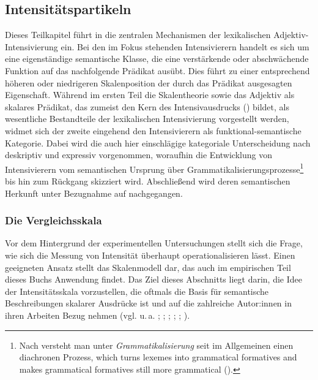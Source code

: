 \subsection{Intensitätspartikeln} \label{Intensivierer}
Dieses Teilkapitel führt in die zentralen Mechanismen der lexikalischen Adjektiv-Intensivierung ein. Bei den im Fokus stehenden Intensivierern handelt es sich um eine eigenständige semantische Klasse, die eine verstärkende oder abschwächende Funktion auf das nachfolgende Prädikat ausübt. Dies führt zu einer entsprechend höheren oder niedrigeren Skalenposition der durch das Prädikat ausgesagten Eigenschaft. Während im ersten Teil die Skalentheorie sowie das Adjektiv als skalares Prädikat, das zumeist den \glqq{}Kern des Intensivausdrucks\grqq{} (\citealt[22]{Os.1989}) bildet, als wesentliche Bestandteile der lexikalischen Intensivierung vorgestellt werden, widmet sich der zweite eingehend den Intensivierern als funktional-semantische Kategorie. Dabei wird die auch hier einschlägige kategoriale Unterscheidung nach deskriptiv und expressiv vorgenommen, woraufhin die Entwicklung von Intensivierern vom semantischen Ursprung über Grammatikalisierungsprozesse\footnote{Nach \citet[]{Lehmann.1986} versteht man unter \textit{Grammatikalisierung} seit \citet[385]{Meillet.1912} im Allgemeinen einen diachronen Prozess, \glqq{}which turns lexemes into grammatical formatives and makes grammatical formatives still more grammatical\grqq{} (\citealt[3]{Lehmann.1986}).} bis hin zum Rückgang skizziert wird. Abschließend wird deren semantischen Herkunft unter Bezugnahme auf \citet[]{Claudi.2006} nachgegangen.

\subsubsection{Die Vergleichsskala} \label{Vergleichsskala}
Vor dem Hintergrund der experimentellen Untersuchungen stellt sich die Frage, wie sich die Messung von Intensität überhaupt operationalisieren lässt. Einen geeigneten Ansatz stellt das Skalenmodell dar, das auch im empirischen Teil dieses Buchs Anwendung findet. Das Ziel dieses Abschnitts liegt darin, die Idee der Intensitätsskala vorzustellen, die oftmals die Basis für semantische Beschreibungen skalarer Ausdrücke ist und auf die zahlreiche Autor:innen in ihren Arbeiten Bezug nehmen (vgl. u.\,a. \citealt[]{Bolinger.1977}; {\citealt[]{Os.1989}}; \citealt[]{Kirschbaum.2002a}; \citealt[]{Kennedy.2005}; {\citealt[]{Breindl.2007}}; {\citealt[]{Kennedy.2007}}).

